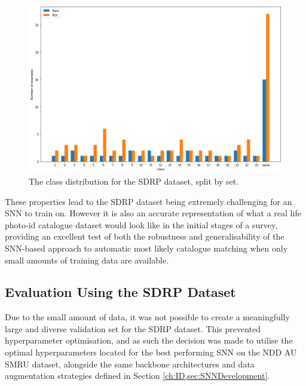 \begin{figure}[h]
	\begin{center}
		\includegraphics[scale=0.38]{Chapter6/figs/SDRP-class-dist.png}
	\end{center}
	\caption{The class distribution for the SDRP dataset, split by set.}
	\label{fig:sdrp-dist}
\end{figure}

These properties lead to the SDRP dataset being extremely challenging for an SNN to train on. However it is also an accurate representation of what a real life photo-id catalogue dataset would look like in the initial stages of a survey, providing an excellent test of both the robustness and generalisability of the SNN-based approach to automatic most likely catalogue matching when only small amounts of training data are available. 

\subsection{Evaluation Using the SDRP Dataset}\label{ch:SNNEvaluation,sec:SDRP,sub:SNNEvalWithSDRP}

Due to the small amount of data, it was not possible to create a meaningfully large and diverse validation set for the SDRP dataset. This prevented hyperparameter optimisation, and as such the decision was made to utilise the optimal hyperparameters located for the best performing SNN on the NDD AU SMRU dataset, alongside the same backbone architectures and data augmentation strategies defined in Section \ref{ch:ID,sec:SNNDevelopment}.

